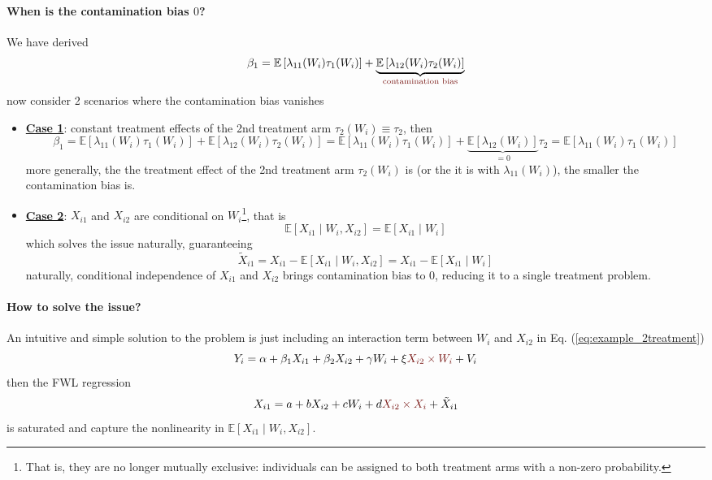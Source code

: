 \documentclass[twoside]{article}
\begin{document}
\paragraph*{When is the contamination bias $0$?} 
We have derived
$$
\beta_1 = \mathbb{E}\left[\lambda_{11}(W_i)\tau_1(W_i)\right] + \underbrace{\mathbb{E}\left[\lambda_{12}(W_i)\tau_2(W_i)\right]}_{\textcolor{myred}{\text{contamination bias}}}
$$
now consider 2 scenarios where the contamination bias vanishes
\begin{itemize}
    \item \textbf{\underline{Case 1}}: constant treatment effects of the 2nd treatment arm $\tau_2(W_i)\equiv \tau_2$, then 
    \begin{equation*}
        \beta_1 = \mathbb{E}\left[\lambda_{11}(W_i)\tau_1(W_i)\right] + \mathbb{E}\left[\lambda_{12}(W_i)\tau_2(W_i)\right] = \mathbb{E}\left[\lambda_{11}(W_i)\tau_1(W_i)\right] + \underbrace{\mathbb{E}\left[\lambda_{12}(W_i)\right]}_{=0}\tau_2 = \mathbb{E}\left[\lambda_{11}(W_i)\tau_1(W_i)\right]
    \end{equation*}
    more generally, the  the treatment effect of the 2nd treatment arm $\tau_2(W_i)$ is (or the  it is with $\lambda_{11}(W_i)$), the smaller the contamination bias is.
    \item \textbf{\underline{Case 2}}: $X_{i1}$ and $X_{i2}$ are  conditional on $W_i$\footnote{That is, they are no longer mutually exclusive: individuals can be assigned to both treatment arms with a non-zero probability.}, that is 
    $$ \mathbb{E}\left[X_{i1}\mid W_i, X_{i2}\right] = \mathbb{E}\left[X_{i1}\mid W_i\right]$$
    which solves the issue naturally, guaranteeing 
    $$
    \tilde{X}_{i1} = X_{i1} - \mathbb{E}\left[X_{i1}\mid W_i,X_{i2}\right] = X_{i1} - \mathbb{E}\left[X_{i1}\mid W_i\right]
    $$
    naturally, conditional independence of $X_{i1}$ and $X_{i2}$ brings contamination bias to 0, reducing it to a single treatment problem.
\end{itemize}

\paragraph*{How to solve the issue?} 
An intuitive and simple solution to the problem is just including an interaction term between $W_i$ and $X_{i2}$ in Eq. (\ref{eq:example_2treatment})
\begin{equation*}
    Y_i = \alpha + \beta_1 X_{i1} + \beta_2 X_{i2} + \gamma W_i + \xi\textcolor{myred}{ X_{i2}\times W_i} +V_i
\end{equation*}
then the FWL regression 
$$
X_{i1} = a + bX_{i2} + cW_i + d\textcolor{myred}{X_{i2}\times X_i} + \tilde{X}_{i1}
$$
is saturated and capture the nonlinearity in $\mathbb{E}\left[ X_{i1}\mid W_i,X_{i2} \right]$.
\end{document}
